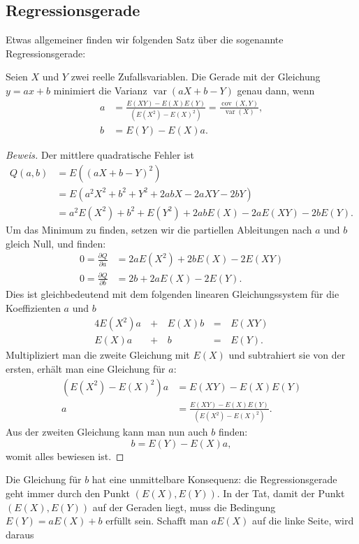 \subsection{Regressionsgerade}
Etwas allgemeiner finden wir folgenden Satz über die sogenannte
Regressionsgerade:
\begin{satz}
\label{rekursion}
Seien $X$ und $Y$ zwei reelle Zufallsvariablen.
Die Gerade mit der
Gleichung $y=ax+b$ minimiert die Varianz
$\operatorname{var}(aX+b-Y)$ genau dann, wenn 
\begin{align*}
a
&=
\frac{E(XY)-E(X)E(Y)}{(E(X^2)-E(X)^2)}=\frac{\operatorname{cov}(X,Y)}{\operatorname{var}(X)},
\\
b
&=
E(Y)-E(X)a.
\end{align*}
\end{satz}
\begin{proof}[Beweis]
Der mittlere quadratische Fehler ist
\begin{align*}
Q(a,b)&=E((aX+b-Y)^2)\\
&=E(a^2X^2+b^2+Y^2+2abX-2aXY -2bY)\\
&=a^2E(X^2)+b^2+E(Y^2)+2abE(X)-2aE(XY)-2bE(Y).
\end{align*}
Um das Minimum zu finden, setzen wir die partiellen Ableitungen nach $a$
und $b$ gleich Null, und finden:
\begin{align*}
0=\frac{\partial Q}{\partial a}&=2aE(X^2)+2bE(X)-2E(XY)\\
0=\frac{\partial Q}{\partial b}&=2b+2aE(X)-2E(Y).
\end{align*}
Dies ist gleichbedeutend mit dem folgenden linearen Gleichungssystem für
die Koeffizienten
$a$ und $b$
\begin{alignat*}{4}
E(X^2)a\,&+\,&E(X)b\,&=\,&E(XY)\\
E(X)a\,&+&b\,&=&E(Y).
\end{alignat*}
Multipliziert man die zweite Gleichung mit $E(X)$ und subtrahiert sie von der
ersten, erhält man eine Gleichung für $a$:
\begin{align*}
(E(X^2)-E(X)^2)a&=E(XY)-E(X)E(Y)\\
a&=\frac{E(XY)-E(X)E(Y)}{(E(X^2)-E(X)^2)}.
\end{align*}
Aus der zweiten Gleichung kann man nun auch $b$ finden:
\[
b=E(Y)-E(X)a,
\]
womit alles bewiesen ist.
\end{proof}
Die Gleichung für $b$ hat eine unmittelbare Konsequenz: die Regressionsgerade
geht immer durch den Punkt $(E(X), E(Y))$.
In der Tat, damit der Punkt
$(E(X), E(Y))$ auf der Geraden liegt, muss die Bedingung $E(Y)=aE(X)+b$
erfüllt sein.
Schafft man $aE(X)$ auf die linke Seite, wird daraus

